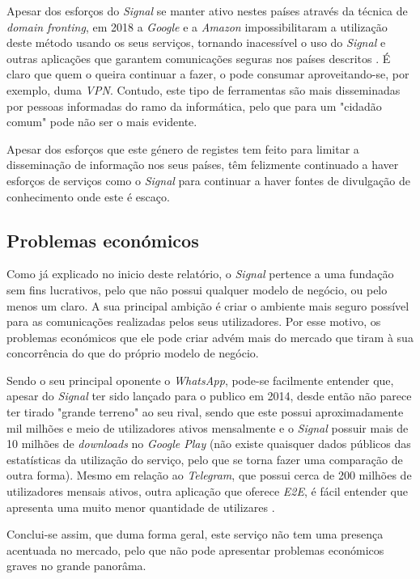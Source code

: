 Apesar dos esforços do \textit{Signal} se manter ativo nestes países através da técnica de \textit{domain fronting}, em 2018 a \textit{Google} e a \textit{Amazon} impossibilitaram a utilização deste método usando os seus serviços, tornando inacessível o uso do \textit{Signal} e outras aplicações que garantem comunicações seguras nos países descritos \cite{signal_amazon_letter}. É claro que quem o queira continuar a fazer, o pode consumar aproveitando-se, por exemplo, duma \textit{VPN}. Contudo, este tipo de ferramentas são mais disseminadas por pessoas informadas do ramo da informática, pelo que para um "cidadão comum" pode não ser o mais evidente.

Apesar dos esforços que este género de registes tem feito para limitar a disseminação de informação nos seus países, têm felizmente continuado a haver esforços de serviços como o \textit{Signal} para continuar a haver fontes de divulgação de conhecimento onde este é escaço.


\subsection{Problemas económicos}
Como já explicado no inicio deste relatório, o \textit{Signal} pertence a uma fundação sem fins lucrativos, pelo que não possui qualquer modelo de negócio, ou pelo menos um claro. A sua principal ambição é criar o ambiente mais seguro possível para as comunicações realizadas pelos seus utilizadores. Por esse motivo, os problemas económicos que ele pode criar advém mais do mercado que tiram à sua concorrência do que do próprio modelo de negócio.

Sendo o seu principal oponente o \textit{WhatsApp}, pode-se facilmente entender que, apesar do \textit{Signal} ter sido lançado para o publico em 2014, desde então não parece ter tirado "grande terreno" ao seu rival, sendo que este possui aproximadamente mil milhões e meio de utilizadores ativos mensalmente e o \textit{Signal} possuir mais de 10 milhões de \textit{downloads} no \textit{Google Play} (não existe quaisquer dados públicos das estatísticas da utilização do serviço, pelo que se torna fazer uma comparação de outra forma). Mesmo em relação ao \textit{Telegram}, que possui cerca de 200 milhões de utilizadores mensais ativos, outra aplicação que oferece \textit{E2E}, é fácil entender que apresenta uma muito menor quantidade de utilizares \cite{other_apps_statistics}. 

Conclui-se assim, que duma forma geral, este serviço não tem uma presença acentuada no mercado, pelo que não pode apresentar problemas económicos graves no grande panorâma.

